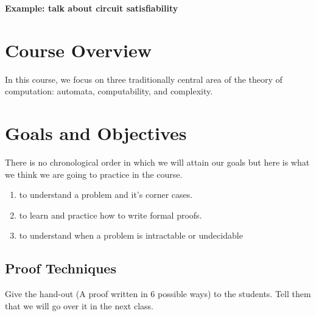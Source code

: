\documentclass[11pt, oneside]{article}   	%
\begin{document}
{\bf Example: talk about circuit satisfiability}
 
\section{Course Overview}
In this course, we focus on three traditionally central area of the theory of computation: automata, computability, and complexity.

\section{Goals and Objectives}
There is no chronological order in which we will attain our goals but here is what we think we are going to practice in the course.
\begin{enumerate}
\item to understand a problem and it's corner cases.
\item to learn and practice how to write formal proofs.
\item to understand when a problem is intractable or undecidable
\end{enumerate}


\subsection{Proof Techniques}
Give the hand-out (A proof written in 6 possible ways) to the students. Tell them that we will go over it in the next class.
\end{document}
